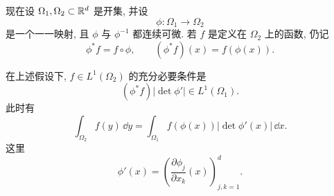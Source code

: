 现在设 \(\Omega_1,\Omega_2\subset\mathbb{R}^d\) 是开集, 并设
\[
\phi:\Omega_1\longrightarrow\Omega_2
\]
是一个一一映射, 且 \(\phi\) 与 \(\phi^{-1}\) 都连续可微. 若 \(f\) 是定义在 \(\Omega_2\) 上的函数, 仍记
\[
\phi^*f=f\circ\phi,
\qquad
(\phi^*f)(x)=f(\phi(x)).
\]

\begin{thm}
	\label{thm:change-of-variables-lebesgue}
	在上述假设下, \(f\in L^1(\Omega_2)\) 的充分必要条件是
	\[
	(\phi^*f)|\det\phi'|\in L^1(\Omega_1).
	\]
	此时有
	\begin{equation}
		\int_{\Omega_2}f(y)\,\dd y
		=
		\int_{\Omega_1}f(\phi(x))|\det\phi'(x)|\,\dd x.
		\label{eq:change-of-variables-lebesgue}
	\end{equation}
	这里
	\[
	\phi'(x)=\left(\frac{\partial \phi_j}{\partial x_k}(x)\right)_{j,k=1}^{d}.
	\]
\end{thm}

